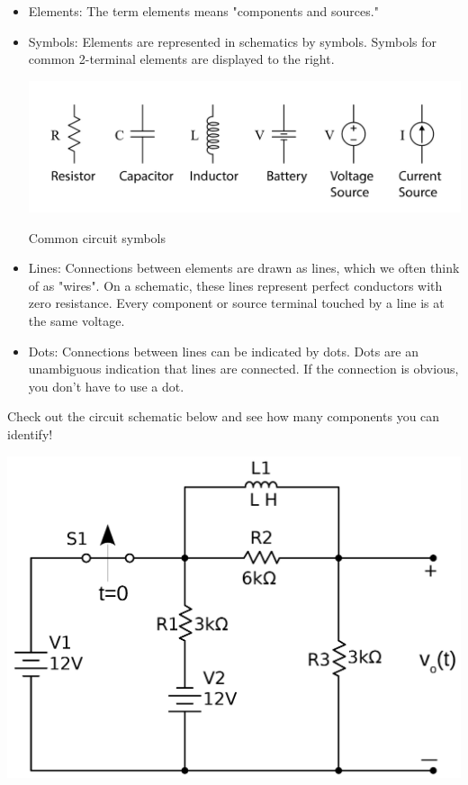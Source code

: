 \documentclass[nobib]{tufte-handout}
\begin{document}
\begin{itemize}
    \item Elements: The term elements means "components and sources."
    \item Symbols: Elements are represented in schematics by symbols. 
    Symbols for common 2-terminal elements are displayed to the right.
    
\begin{marginfigure}
    \centering
    \includegraphics{images/symbols.png}
    \caption{Common circuit symbols}
    \label{fig:symbols}
\end{marginfigure} 

    \item Lines: Connections between elements are drawn as lines, 
    which we often think of as "wires". On a schematic, 
    these lines represent perfect conductors with zero resistance. 
    Every component or source terminal touched by a line is at the same voltage.
    \item Dots: Connections between lines can be indicated by dots. 
    Dots are an unambiguous indication that lines are connected. 
    If the connection is obvious, you don't have to use a dot.
\end{itemize}
Check out the circuit schematic below and see how many components you 
can identify!
\begin{center}
    \includegraphics[width=\textwidth/2]{images/PS0_CapacitorCircuit.png}
\end{center}
\end{document}
